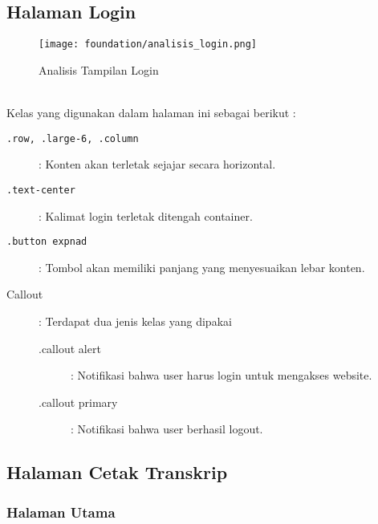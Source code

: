 \subsection{Halaman Login}
\begin{figure} [H]
	\centering  
	\texttt{[image: foundation/analisis\_login.png]}  
	\caption{Analisis Tampilan Login} 
\end{figure} \noindent \\
Kelas yang digunakan dalam halaman ini sebagai berikut :
\begin{description}
	\item [\texttt{.row, .large-6, .column}] : Konten akan terletak sejajar secara horizontal.
	\item [\texttt{.text-center}] : Kalimat login terletak ditengah container.
	\item [\texttt{.button expnad}] : Tombol akan memiliki panjang yang menyesuaikan lebar konten.
	\item [Callout] : Terdapat dua jenis kelas yang dipakai
		\begin{description}
			\item[.callout alert]	: Notifikasi bahwa user harus login untuk mengakses website.
			\item[.callout primary]	: Notifikasi bahwa user berhasil logout.
		\end{description}
		
\end{description}

\subsection{Halaman Cetak Transkrip}
\subsubsection{Halaman Utama}

